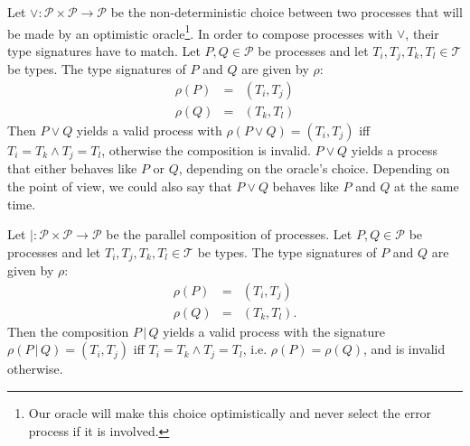 \begin{definition}
\label{def:static_choice}
Let $\vee \colon \mathcal{P} \times \mathcal{P} \to \mathcal{P}$ be the non-deterministic choice between two processes that will be made by an optimistic oracle\footnote{Our oracle will make this choice optimistically and never select the error process if it is involved.}. In order to compose processes with $\vee$, their type signatures have to match. Let $P, Q \in \mathcal{P}$ be processes and let $T_i, T_j, T_k, T_l \in \mathcal{T}$ be types. The type signatures of $P$ and $Q$ are given by $\rho$:
\begin{eqnarray}
  \rho \left( P \right) & = & \left( T_i, T_j \right) \\
  \rho \left( Q \right) & = & \left( T_k, T_l \right)
\end{eqnarray}
Then $P \vee Q$ yields a valid process with $\rho \left( P \vee Q \right) = \left( T_i, T_j \right)$ iff $T_i = T_k \wedge T_j = T_l$, otherwise the composition is invalid. $P \vee Q$ yields a process that either behaves like $P$ or $Q$, depending on the oracle's choice. Depending on the point of view, we could also say that $P \vee Q$ behaves like $P$ and $Q$ at the same time.

\hfill\qedsymbol
\end{definition}


\begin{definition}
Let $| \colon \mathcal{P} \times \mathcal{P} \to \mathcal{P}$ be the parallel composition of processes. Let $P, Q \in \mathcal{P}$ be processes and let $T_i, T_j, T_k, T_l \in \mathcal{T}$ be types. The type signatures of $P$ and $Q$ are given by $\rho$:
\begin{eqnarray*}
  \rho \left( P \right) & = & \left( T_i, T_j \right) \\
  \rho \left( Q \right) & = & \left( T_k, T_l \right).
\end{eqnarray*}
Then the composition $P \,|\, Q$ yields a valid process with the signature $\rho \left( P \,|\, Q \right) = \left( T_i, T_j \right)$ iff $T_i = T_k \wedge T_j = T_l$, i.e. $\rho \left( P \right) = \rho \left( Q \right)$, and is invalid otherwise.

\hfill\qedsymbol
\end{definition}


